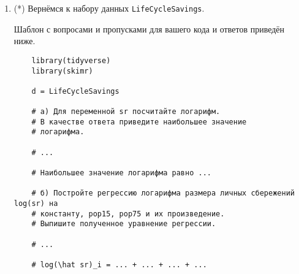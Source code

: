 \documentclass[12pt]{article}
\begin{document}
\begin{enumerate}
\begin{verbatim}
        # ...

        # В наборе данных ... наблюдений.

        # Далее работаем с полученным набором данных.
        # б) Чему равно максимальное значение переменной sr?
        # (в данных sr измерено в процентах от располагаемого дохода)

        # ...

        # Максимальное значение sr равно ... 

        # в) Постройте регрессию размера личных сбережений sr на 
        # константу, долю населения младше 15 лет pop15, 
        # долю населения старше 75 pop75.
        # Выпишите полученное уравнение регрессии. 

        # ...

        # hat_sr_i = ... + ... + ... 

        # г) Постройте 99%-й доверительный интервал для коэффициента 
        # при pop75. 

        # ...

        # Интервал: [..., ...]

        # д) Какой прогноз личных сбережений для страны 
        # с 20% населения младше 15 лет и 10% населения старше 75 лет
        # даёт данная модель?

        # ...

        # Прогноз равен ...
    \end{verbatim}

    \newpage
\item (*) Вернёмся к набору данных \verb|LifeCycleSavings|.

Шаблон с вопросами и пропусками для вашего кода и ответов приведён ниже. 

\begin{verbatim}
    library(tidyverse)
    library(skimr)

    d = LifeCycleSavings

    # а) Для переменной sr посчитайте логарифм. 
    # В качестве ответа приведите наибольшее значение 
    # логарифма.

    # ...

    # Наибольшее значение логарифма равно ... 

    # б) Постройте регрессию логарифма размера личных сбережений log(sr) на 
    # константу, pop15, pop75 и их произведение.
    # Выпишите полученное уравнение регрессии. 

    # ...

    # log(\hat sr)_i = ... + ... + ... + ...


\end{verbatim}
\end{enumerate}
\end{document}
